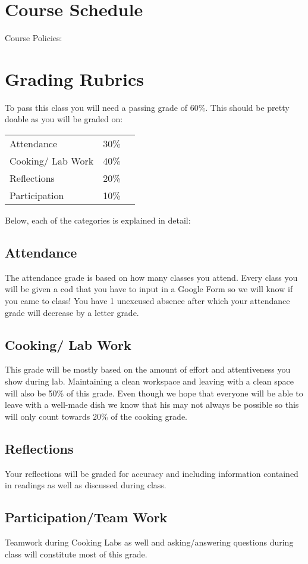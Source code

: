 \documentclass{article}
\begin{document}
\section{Course Schedule}
Course Policies: 

\section{Grading Rubrics} 


To pass this class you will need a passing grade of 60\%. This should be pretty doable as you will be graded on:

\begin{table}[h]
\begin{tabular}{lll}
 Attendance &  30\% \\
 Cooking/ Lab Work & 40\%  \\
 Reflections &  20\%  \\
 Participation & 10\% \\ 
\end{tabular}
\end{table}   

Below, each of the categories is explained in detail:
\subsection{Attendance}
 The attendance grade is based on how many classes you attend. Every class you will be given a cod that you have to input in a Google Form so we will know if you came to class! You have 1 unexcused absence after which  your attendance grade will decrease by a letter grade.

\subsection{Cooking/ Lab Work} This grade will be mostly based on the amount of effort and attentiveness you show during lab. Maintaining a clean workspace and leaving with a clean space will also be 50\% of this grade. Even though we hope that everyone will be able to leave with a well-made dish we know that his may not always be possible so this will only count towards 20\% of the cooking grade.

\subsection{Reflections} Your reflections will be graded for accuracy and including information contained in readings as well as discussed during class.

\subsection{Participation/Team Work} Teamwork during Cooking Labs as well and asking/answering questions during class will constitute most of this grade.
\end{document}
